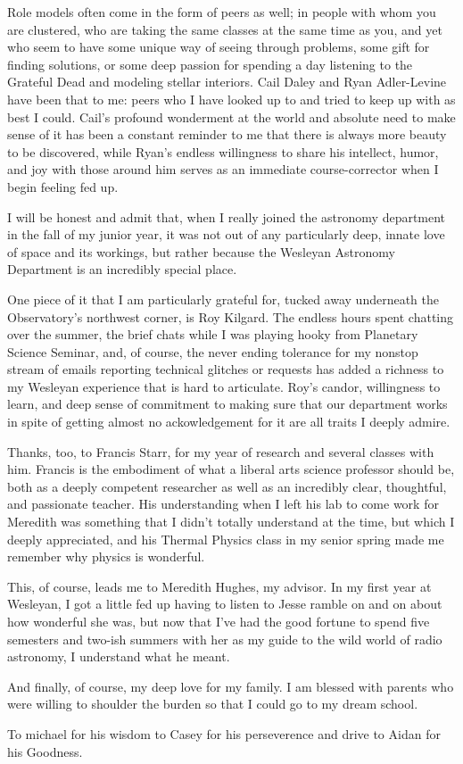 Role models often come in the form of peers as well; in people with whom you are clustered, who are taking the same classes at the same time as you, and yet who seem to have some unique way of seeing through problems, some gift for finding solutions, or some deep passion for spending a day listening to the Grateful Dead and modeling stellar interiors. Cail Daley and Ryan Adler-Levine have been that to me: peers who I have looked up to and tried to keep up with as best I could. Cail's profound wonderment at the world and absolute need to make sense of it has been a constant reminder to me that there is always more beauty to be discovered, while Ryan's endless willingness to share his intellect, humor, and joy with those around him serves as an immediate course-corrector when I begin feeling fed up.


I will be honest and admit that, when I really joined the astronomy department in the fall of my junior year, it was not out of any particularly deep, innate love of space and its workings, but rather because the Wesleyan Astronomy Department is an incredibly special place.

One piece of it that I am particularly grateful for, tucked away underneath the Observatory's northwest corner, is Roy Kilgard. The endless hours spent chatting over the summer, the brief chats while I was playing hooky from Planetary Science Seminar, and, of course, the never ending tolerance for my nonstop stream of emails reporting technical glitches or requests has added a richness to my Wesleyan experience that is hard to articulate. Roy's candor, willingness to learn, and deep sense of commitment to making sure that our department works in spite of getting almost no ackowledgement for it are all traits I deeply admire.


Thanks, too, to Francis Starr, for my year of research and several classes with him. Francis is the embodiment of what a liberal arts science professor should be, both as a deeply competent researcher as well as an incredibly clear, thoughtful, and passionate teacher. His understanding when I left his lab to come work for Meredith was something that I didn't totally understand at the time, but which I deeply appreciated, and his Thermal Physics class in my senior spring made me remember why physics is wonderful.


This, of course, leads me to Meredith Hughes, my advisor. In my first year at Wesleyan, I got a little fed up having to listen to Jesse ramble on and on about how wonderful she was, but now that I've had the good fortune to spend five semesters and two-ish summers with her as my guide to the wild world of radio astronomy, I understand what he meant.



And finally, of course, my deep love for my family. I am blessed with parents who were willing to shoulder the burden so that I could go to my dream school.

To michael for his wisdom
to Casey for his perseverence and drive
to Aidan for his Goodness.





